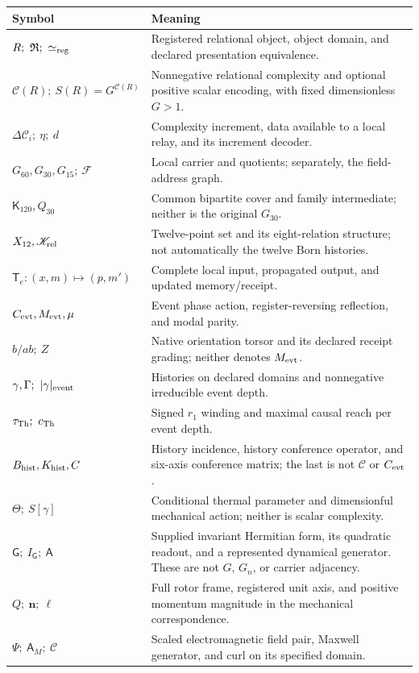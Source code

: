 \smallskip
\small
\noindent\begin{tabularx}{\textwidth}{@{}p{}X@{}}
\toprule
Symbol & Meaning \\
\midrule
$R;\ \mathfrak R;\ \simeq_{\rm reg}$ & Registered relational object, object domain, and declared presentation equivalence. \\
$\mathcal C(R);\ S(R)=G^{\mathcal C(R)}$ & Nonnegative relational complexity and optional positive scalar encoding, with fixed dimensionless $G>1$. \\
$\Delta\mathcal C_i;\ \eta;\ d$ & Complexity increment, data available to a local relay, and its increment decoder. \\
$G_{60},G_{30},G_{15};\ \mathcal F$ & Local carrier and quotients; separately, the field-address graph. \\
$\mathsf K_{120},Q_{30}$ & Common bipartite cover and family intermediate; neither is the original $G_{30}$. \\
$X_{12},\mathscr K_{\rm rel}$ & Twelve-point set and its eight-relation structure; not automatically the twelve Born histories. \\
$\mathsf T_e:(x,m)\mapsto(p,m')$ & Complete local input, propagated output, and updated memory/receipt. \\
$C_{\mathrm{evt}},M_{\mathrm{evt}},\mu$ & Event phase action, register-reversing reflection, and modal parity. \\
$b/ab;\ Z$ & Native orientation torsor and its declared receipt grading; neither denotes $M_{\mathrm{evt}}$. \\
$\gamma,\Gamma;\ |\gamma|_{\rm event}$ & Histories on declared domains and nonnegative irreducible event depth. \\
$\tth;\ \cth$ & Signed $r_1$ winding and maximal causal reach per event depth. \\
$B_{\rm hist},K_{\rm hist},C$ & History incidence, history conference operator, and six-axis conference matrix; the last is not $\mathcal C$ or $C_{\mathrm{evt}}$. \\
$\Theta;\ S[\gamma]$ & Conditional thermal parameter and dimensionful mechanical action; neither is scalar complexity. \\

$\mathsf G;\ I_{\mathsf G};\ \mathsf A$ & Supplied invariant Hermitian form, its quadratic readout, and a represented dynamical generator. These are not $G$, $G_n$, or carrier adjacency. \\
$Q;\ \mathbf n;\ \ell$ & Full rotor frame, registered unit axis, and positive momentum magnitude in the mechanical correspondence. \\
$\Psi;\ \mathsf A_M;\ \mathscr C$ & Scaled electromagnetic field pair, Maxwell generator, and curl on its specified domain. \\
\bottomrule
\end{tabularx}
\normalsize

